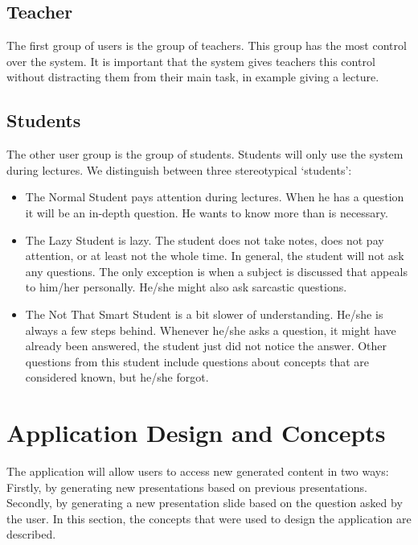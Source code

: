 \documentclass[11pt]{article}
\begin{document}
\subsection{Teacher}
The first group of users is the group of teachers. This group has the most control over the system. It is important that the system gives teachers this control without distracting them from their main task, in example giving a lecture.

\subsection{Students}
The other user group is the group of students. Students will only use the system during lectures. We distinguish between three stereotypical `students’:
\begin{itemize}
\item The Normal Student pays attention during lectures. When he has a question it will be an in-depth question. He wants to know more than is necessary.
\item The Lazy Student is lazy. The student does not take notes, does not pay attention, or at least not the whole time. In general, the student will not ask any questions. The only exception is when a subject is discussed that appeals to him/her personally. He/she might also ask sarcastic questions.
\item The Not That Smart Student is a bit slower of understanding. He/she is always a few steps behind. Whenever he/she asks a question, it might have already been answered, the student just did not notice the answer. Other questions from this student include questions about concepts that are considered known, but he/she forgot.
\end{itemize}
\section{Application Design and Concepts}
The application will allow users to access new generated content in two ways: Firstly, by generating new presentations based on previous presentations. Secondly, by generating a new presentation slide based on the question asked by the user. In this section, the concepts that were used to design the application are described.
\end{document}
